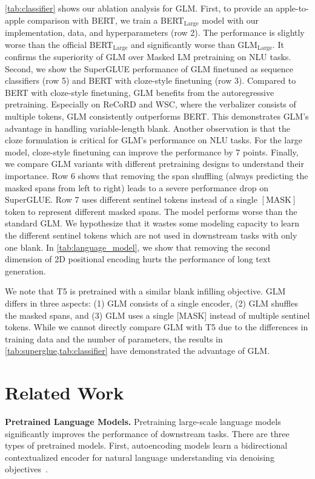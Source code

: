 \ref{tab:classifier} shows our ablation analysis for GLM. First, to provide an apple-to-apple comparison with BERT, we train a BERT$_\text{Large}$ model  with our implementation, data, and hyperparameters (row 2). The performance is slightly worse than the official BERT$_\text{Large}$ and significantly worse than GLM$_\text{Large}$. It confirms the superiority of GLM over Masked LM pretraining on NLU tasks. Second, we show the SuperGLUE performance of GLM finetuned as sequence classifiers (row 5) and BERT with cloze-style finetuning (row 3). Compared to BERT with cloze-style finetuning, GLM benefits from the autoregressive pretraining. Especially on ReCoRD and WSC, where the verbalizer consists of multiple tokens, GLM consistently outperforms BERT. This demonstrates GLM's advantage in handling variable-length blank. Another observation is that the cloze formulation is critical for GLM's performance on NLU tasks. For the large model, cloze-style finetuning can improve the performance by 7 points. Finally, we compare GLM variants with different pretraining designs to understand their importance. Row 6 shows that removing the span shuffling (always predicting the masked spans from left to right) leads to a severe performance drop on SuperGLUE. Row 7 uses different sentinel tokens instead of a single $[\text{MASK}]$ token to represent different masked spans. The model performs worse than the standard GLM. We hypothesize that it wastes some modeling capacity to learn the different sentinel tokens which are not used in downstream tasks with only one blank. In \ref{tab:language_model}, we show that removing the second dimension of 2D positional encoding hurts the performance of long text generation.

We note that T5 is pretrained with a similar blank infilling objective. GLM differs in three aspects: (1) GLM consists of a single encoder, (2) GLM shuffles the masked spans, and (3) GLM uses a single [MASK] instead of multiple sentinel tokens. While we cannot directly compare GLM with T5 due to the differences in training data and the number of parameters, the results in \ref{tab:superglue,tab:classifier} have demonstrated the advantage of GLM.

\section{Related Work}
\textbf{Pretrained Language Models.} Pretraining large-scale language models significantly improves the performance of downstream tasks. There are three types of pretrained models. First, autoencoding models learn a bidirectional contextualized encoder for natural language understanding via denoising objectives~\cite{devlinBERT2019,joshiSpanBERT2020,YangXLNet2019,RoBERTa,ALBERT:lan2020,ELECTRA:clark2020}. 

